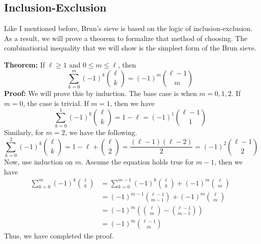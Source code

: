 \subsection{Inclusion-Exclusion}
Like I mentioned before, Brun's sieve is based on the logic of inclusion-exclusion. As a result, we will prove a theorem to formalize that method of choosing. The combinatiorial inequality that we will show is the simplest form of the Brun sieve.
\begin{boxedsection}
\textbf{Theorem:} If $\ell \geq 1$ and $0 \leq m \leq \ell$, then
$$
\sum_{k=0}^m (-1)^k {\ell \choose k}  = (-1)^m {\ell - 1 \choose m}
$$
\textbf{Proof:} We will prove this by induction. The base case is when $m = 0,1,2$. If $m = 0$, the case is trivial. If $m = 1$, then we have 
$$
\sum_{k=0}^1 (-1)^k {\ell \choose k} = 1 - \ell = (-1)^1 {\ell - 1 \choose 1}
$$
Similarly, for $m = 2$, we have the following.
$$
\sum_{k=0}^2 (-1)^k {\ell \choose k} = 1 - \ell + {\ell \choose 2} = \frac{(\ell-1)(\ell -2)}{2} = (-1)^2 {\ell - 1 \choose 2}
$$
Now, use induction on $m$. Assume the equation holds true for $m-1$, then we have
\begin{align*}
    \sum_{k=0}^m (-1)^k {\ell \choose k} &= \sum_{k=0}^{m-1} (-1)^k {\ell \choose k} + (-1)^m {\ell \choose m}\\
    &= (-1)^{m-1} {\ell - 1 \choose m-1} + (-1)^m {\ell \choose m}\\
    &= (-1)^m \left({\ell \choose m} - {\ell - 1 \choose m-1}\right)\\
    &= (-1)^m {\ell - 1 \choose m}
\end{align*}
Thus, we have completed the proof.
\end{boxedsection}
